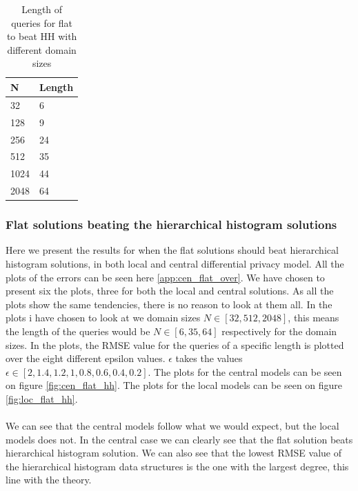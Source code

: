 \documentclass[11pt]{article}
\theoremstyle{definition}
\begin{document}
\begin{table}[H]
\centering
\begin{tabular}{|l|l|}
\hline
N    &  Length     \\ \hline
32  & 6 \\ \hline
128  & 9 \\ \hline
256  & 24 \\ \hline
512  & 35        \\ \hline
1024 & 44         \\ \hline
2048 & 64         \\ \hline
\end{tabular}
\caption{Length of queries for flat to beat HH with different domain sizes}
\label{hh_v_flat}
\end{table}

\subsubsection{Flat solutions beating the hierarchical histogram solutions}
Here we present the results for when the flat solutions should beat hierarchical histogram solutions, in both local and central differential privacy model. All the plots of the errors can be seen here \ref{app:cen_flat_over}. We have chosen to present six the plots, three for both the local and central solutions. As all the plots show the same tendencies, there is no reason to look at them all. In the plots i have chosen to look at we domain sizes $N\in[32,512,2048]$, this means the length of the queries would be $N\in[6,35,64]$ respectively for the domain sizes. In the plots, the RMSE value for the queries of a specific length is plotted over the eight different epsilon values. $\epsilon$ takes the values $\epsilon\in[2, 1.4, 1.2, 1, 0.8, 0.6, 0.4, 0.2]$.  The plots for the central models can be seen on figure \ref{fig:cen_flat_hh}. The plots for the local models can be seen on figure \ref{fig:loc_flat_hh}. \\ \\
We can see that the central models follow what we would expect, but the local models does not. In the central case we can clearly see that the flat solution beats hierarchical histogram solution. We can also see that the lowest RMSE value of the hierarchical histogram data structures is the one with the largest degree, this line with the theory.\\ \\
\end{document}
